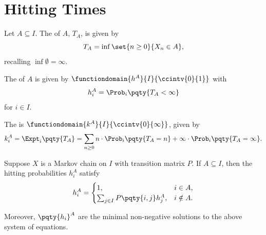 \section{Hitting Times}

\begin{definition}
    Let \(A \subseteq I\). The  of \(A\), \(T_A\), is given by
    \[
        T_A = \inf\set{n \geq 0}{X_n \in A},
    \]
    recalling \(\inf \emptyset = \infty\).

    The  of \(A\) is given by \(\functiondomain{h^A}{I}{\ccintv{0}{1}}\) with
    \[
        h_i^A = \Prob_i \pqty{T_A < \infty}
    \]
    for \(i \in I\).

    The  is \(\functiondomain{k^A}{I}{\ccintv{0}{\infty}}\), given by
    \[
        k_i^A = \Expt_i \pqty{T_A} = \sum_{n \geq 0} n \cdot \Prob_i \pqty{T_A = n} + \infty \cdot \Prob_i \pqty{T_A = \infty}.
    \]
\end{definition}

\begin{theorem}
    \label{thm:hitting-probabilities}%
    Suppose \(X\) is a Markov chain on \(I\) with transition matrix \(P\). If \(A \subseteq I\), then the hitting probabilities \(h_i^A\) satisfy
    \[
        h_i^A = \begin{cases}
            1, & i \in A, \\
            \sum_{j \in I} P \pqty{i, j} h_j^A, & i \notin A.
        \end{cases}
    \]

    Moreover, \(\pqty{h_i}^A\) are the minimal non-negative solutions to the above system of equations.
\end{theorem}

